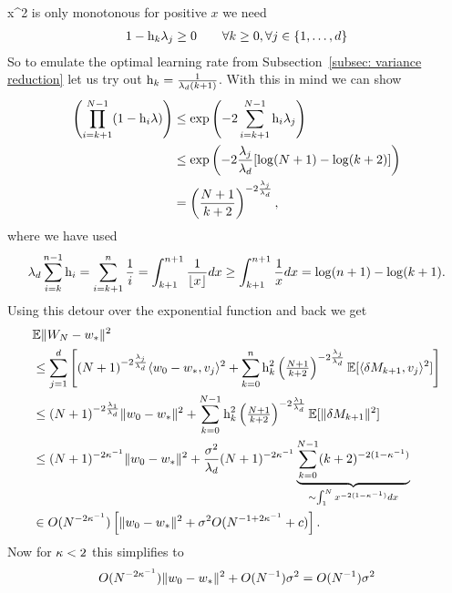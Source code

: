 x^2\) is only monotonous for positive \(x\) we need
\begin{align*}
	1-\text{h}_k \lambda_j \ge 0 \qquad \forall k\ge 0, \forall j \in\{1,\dots,d\}
\end{align*}
So to emulate the optimal learning rate from Subsection~\ref{subsec: variance reduction}
let us try out \(\text{h}_k = \tfrac{1}{\lambda_d(k+1)}\). With this in
mind we can show
\begin{align*}
	\left(\prod_{i=k+1}^{N-1}(1-\text{h}_i\lambda)\right)
	&\le\exp\left(-2\sum_{i=k+1}^{N-1}\text{h}_i\lambda_j\right)\\
	&\le \exp\left(-2\frac{\lambda_j}{\lambda_d}[\log(N+1)-\log(k+2)]\right)\\
	&= \left(\frac{N+1}{k+2}\right)^{-2\frac{\lambda_j}{\lambda_d}},
\end{align*}
where we have used
\begin{align*}
	\lambda_d\sum_{i=k}^{n-1} \text{h}_i
	= \sum_{i=k+1}^n \frac{1}{i}
	= \int_{k+1}^{n+1} \frac{1}{\lfloor x\rfloor} dx
	\ge \int_{k+1}^{n+1} \frac{1}x dx
	= \log(n+1) - \log(k+1).
\end{align*}
Using this detour over the exponential function and back we get
\begin{align*}
	&\mathbb{E}\|W_N - w_*\|^2\\
	&\le \sum_{j=1}^d \Bigg[ (N+1)^{-2\frac{\lambda_j}{\lambda_d}}\langle w_0-w_*, v_j\rangle^2
	+ \sum_{k=0}^n \text{h}_k^2 \left(\tfrac{N+1}{k+2}\right)^{-2\frac{\lambda_j}{\lambda_d}}
	\mathbb{E}[\langle\delta M_{k+1},v_j\rangle^2]\Bigg]\\
	&\le (N+1)^{-2\frac{\lambda_1}{\lambda_d}}\|w_0-w_*\|^2
	+ \sum_{k=0}^{N-1} \text{h}_k^2 \left(\tfrac{N+1}{k+2}\right)^{-2\frac{\lambda_1}{\lambda_d}}
	\mathbb{E}[\|\delta M_{k+1}\|^2]\\
	&\le (N+1)^{-2\kappa^{-1}}\|w_0-w_*\|^2
	+ \frac{\sigma^2}{\lambda_d} (N+1)^{-2\kappa^{-1}}
	\underbrace{\sum_{k=0}^{N-1} (k+2)^{-2(1-\kappa^{-1})}}_{\sim \int_1^N x^{-2(1-\kappa^{-1})}dx}\\
	&\in O(N^{-2\kappa^{-1}})\left[\|w_0-w_*\|^2 + \sigma^2 O(N^{-1+2\kappa^{-1}} + c) \right].
\end{align*}
Now for \(\kappa<2\) this simplifies to 
\begin{align*}
	O(N^{-2\kappa^{-1}})\|w_0-w_*\|^2 + O(N^{-1})\sigma^2
	= O(N^{-1})\sigma^2
\end{align*}
